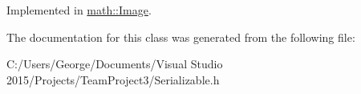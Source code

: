 Implemented in \hyperlink{classmath_1_1_image_a5a48aa778e407699272463a1be8ac16f}{math\+::\+Image}.



The documentation for this class was generated from the following file\+:\begin{DoxyCompactItemize}
\item 
C\+:/\+Users/\+George/\+Documents/\+Visual Studio 2015/\+Projects/\+Team\+Project3/Serializable.\+h\end{DoxyCompactItemize}
